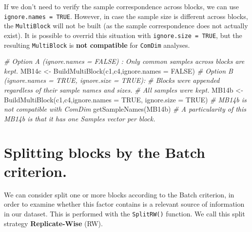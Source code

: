 \documentclass[
]{book}
\newenvironment{Shaded}{\begin{snugshade}}{\end{snugshade}}
\newcommand{\AttributeTok}[1]{\textcolor[rgb]{0.77,0.63,0.00}{#1}}
\newcommand{\CommentTok}[1]{\textcolor[rgb]{0.56,0.35,0.01}{\textit{#1}}}
\newcommand{\ConstantTok}[1]{\textcolor[rgb]{0.00,0.00,0.00}{#1}}
\newcommand{\FunctionTok}[1]{\textcolor[rgb]{0.00,0.00,0.00}{#1}}
\newcommand{\NormalTok}[1]{#1}
\newcommand{\OtherTok}[1]{\textcolor[rgb]{0.56,0.35,0.01}{#1}}
\begin{document}
If we don't need to verify the sample correspondence across blocks, we can use
\texttt{ignore.names\ =\ TRUE}. However, in case the sample size is different across
blocks, the \texttt{MultiBlock} will not be built (as the sample correspondence does
not actually exist). It is possible to overrid this situation with
\texttt{ignore.size\ =\ TRUE}, but the resulting \texttt{MultiBlock} is \textbf{not compatible} for
\texttt{ComDim} analyses.

\begin{Shaded}
\begin{Highlighting}[]
\CommentTok{\# Option A (ignore.names = FALSE) : Only common samples across blocks are kept.}
\NormalTok{MB14c }\OtherTok{\textless{}{-}} \FunctionTok{BuildMultiBlock}\NormalTok{(c1,c4,}\AttributeTok{ignore.names =} \ConstantTok{FALSE}\NormalTok{)}
\CommentTok{\# Option B (ignore.names = TRUE, ignore.size = TRUE):}
\CommentTok{\#    Blocks were appended regardless of their sample names and sizes.}
\CommentTok{\#    All samples were kept.}
\NormalTok{MB14b }\OtherTok{\textless{}{-}} \FunctionTok{BuildMultiBlock}\NormalTok{(c1,c4,}\AttributeTok{ignore.names =} \ConstantTok{TRUE}\NormalTok{, }\AttributeTok{ignore.size =} \ConstantTok{TRUE}\NormalTok{)}
\CommentTok{\# MB14b is not compatible with ComDim}
\FunctionTok{getSampleNames}\NormalTok{(MB14b)}
\CommentTok{\# A particularity of this MB14b is that it has one \textquotesingle{}Samples\textquotesingle{} vector per block.}
\end{Highlighting}
\end{Shaded}

\hypertarget{splitRW}{%
\section{Splitting blocks by the Batch criterion.}\label{splitRW}}

We can consider split one or more blocks according to the Batch criterion, in
order to examine whether this factor contains is a relevant source of
information in our dataset. This is performed with the \texttt{SplitRW()} function.
We call this split strategy \textbf{Replicate-Wise} (RW).
\end{document}
